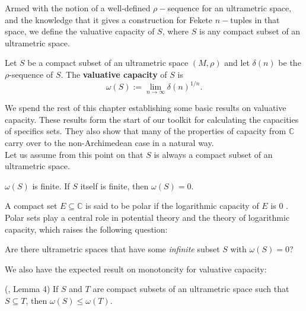 Armed with the notion of a well-defined $\rho-$sequence for an ultrametric space, and the knowledge that it gives a construction for Fekete $n-$tuples in that space, we define the valuative capacity of $S$, where $S$ is any compact subset of an ultrametric space.\\

\begin{definition}
	\cite{kj}  Let $S$ be a compact subset of an ultrametric space $(M,\rho)$ and let $\delta(n)$ be the $\rho$-sequence of $S$. The \textbf{valuative capacity} of $S$ is \[\omega(S)
	:= \lim_{n\to\infty} \delta(n)^{1/n}.\]  
\end{definition}

We spend the rest of this chapter establishing some basic results on valuative capacity. These results form the start of our toolkit for calculating the capacities of specifics sets. They also show that many of the properties of capacity from $\mathbb{C}$ carry over to the non-Archimedean case in a natural way. \\

Let us assume from this point on that $S$ is always a compact subset of an ultrametric space.\\ 

\begin{proposition}
 $\omega(S)$ is finite. If $S$ itself is finite, then $\omega(S) =0$.
\end{proposition}

A compact set $E \subseteq \mathbb{C}$ is said to be polar if the logarithmic capacity of $E$ is $0$ \cite{rand}. Polar sets play a central role in potential theory and the theory of logarithmic capacity, which raises the following question:\\

\begin{question}
Are there ultrametric spaces that have some \textit{infinite} subset $S$ with $\omega(S)=0$?
\end{question}

We also have the expected result on monotoncity for valuative capacity:\\

\begin{proposition}
	(\cite{kj}, Lemma 4) If $S$ and $T$ are compact subsets of an ultrametric space such that $S \subseteq T$, then $\omega(S) \leq \omega(T)$. 
\end{proposition}


